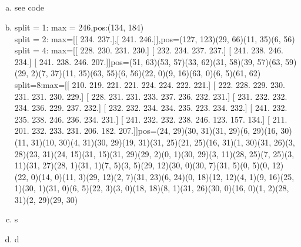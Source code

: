 \documentclass[12pt]{article}
\begin{document}

\setcounter{section}{9}
\setcounter{subsection}{0}


\subsection{ }


\subsection{ }


\subsection{ }



\subsection{ }
\begin{enumerate}[a)]
\item see code
\item split = 1: max = 246,pos:(134, 184)\\split = 2: max=[[ 234.  237.],[ 241.  246.]],pos=(127, 123)(29, 66)(11, 35)(6, 56)\\split = 4: max=[[ 228.  230.  231.  230.] [ 232.  234.  237.  237.] [ 241.  238.  246.  234.] [ 241.  238.  246.  207.]]pos=(51, 63)(53, 57)(33, 62)(31, 58)(39, 57)(63, 59)(29, 2)(7, 37)(11, 35)(63, 55)(6, 56)(22, 0)(9, 16)(63, 0)(6, 5)(61, 62)\\split=8:max=[[ 210.  219.  221.  221.  224.  224.  222.  221.] [ 222.  228.  229.  230.  231.  231.  230.  229.] [ 228.  231.  231.  233.  237.  236.  232.  231.] [ 231.  232.  232.  234.  236.  229.  237.  232.] [ 232.  232.  234.  234.  235.  223.  234.  232.] [ 241.  232.  235.  238.  246.  236.  234.  231.] [ 241.  232.  232.  238.  246.  123.  157.  134.] [ 211.  201.  232.  233.  231.  206.  182.  207.]]pos=(24, 29)(30, 31)(31, 29)(6, 29)(16, 30)(11, 31)(10, 30)(4, 31)(30, 29)(19, 31)(31, 25)(21, 25)(16, 31)(1, 30)(31, 26)(3, 28)(23, 31)(24, 15)(31, 15)(31, 29)(29, 2)(0, 1)(30, 29)(3, 11)(28, 25)(7, 25)(3, 11)(31, 27)(28, 1)(31, 1)(7, 5)(3, 5)(29, 12)(30, 0)(30, 7)(31, 5)(0, 5)(0, 12)(22, 0)(14, 0)(11, 3)(29, 12)(2, 7)(31, 23)(6, 24)(0, 18)(12, 12)(4, 1)(9, 16)(25, 1)(30, 1)(31, 0)(6, 5)(22, 3)(3, 0)(18, 18)(8, 1)(31, 26)(30, 0)(16, 0)(1, 2)(28, 31)(2, 29)(29, 30)
 \item s
\item d
\end{enumerate}


\subsection{ }


\subsection{ }
\end{document}
